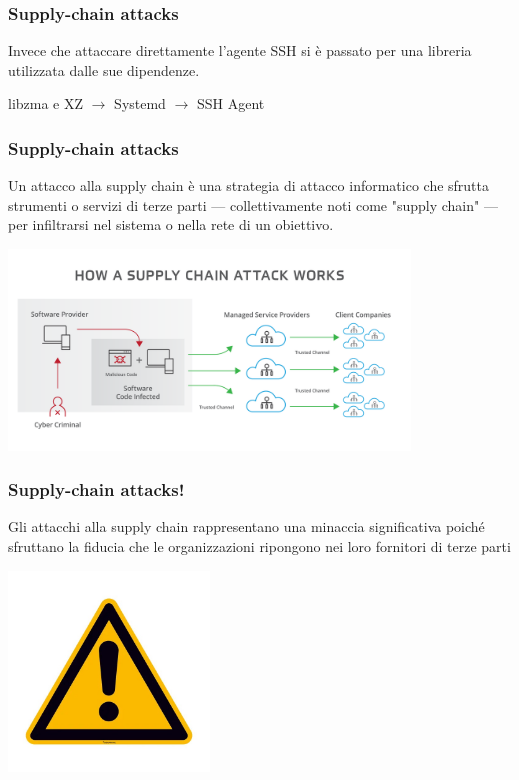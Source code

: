 \begin{frame}
\frametitle{Supply-chain attacks}
Invece che attaccare direttamente l'agente SSH si è passato per una libreria utilizzata dalle sue dipendenze.

\vspace{1 cm}
\centering
    libzma e XZ $\rightarrow$ Systemd $\rightarrow$ SSH Agent

\end{frame}

\begin{frame}
\frametitle{Supply-chain attacks}

Un attacco alla supply chain è una strategia di attacco informatico che sfrutta strumenti o servizi di terze parti — collettivamente noti come "supply chain" — per infiltrarsi nel sistema o nella rete di un obiettivo.

\includegraphics[width=0.8\textwidth]{img/2-Introduction/supplychain.png}
\end{frame}


\begin{frame}
\frametitle{Supply-chain attacks!}

Gli attacchi alla supply chain rappresentano una minaccia significativa poiché sfruttano la fiducia che le organizzazioni ripongono nei loro fornitori di terze parti
\begin{center}
  \includegraphics[width=0.4\textwidth]{img/2-Introduction/Warning.jpg}  
\end{center}
    
\end{frame}

